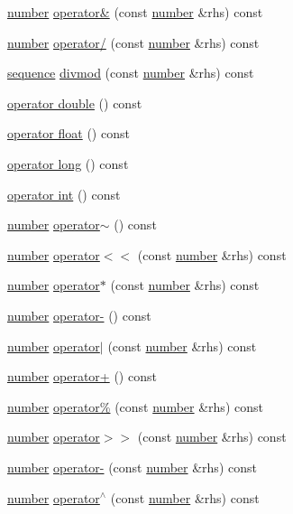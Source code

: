 \begin{DoxyCompactItemize}
\item 
\hyperlink{classpy_1_1number}{number} \hyperlink{classpy_1_1number_afbc448681bb327f89e74c28ebe852c90}{operator\&} (const \hyperlink{classpy_1_1number}{number} \&rhs) const 
\item 
\hyperlink{classpy_1_1number}{number} \hyperlink{classpy_1_1number_a9d61eba9d2067c9c24a053403bfdc526}{operator/} (const \hyperlink{classpy_1_1number}{number} \&rhs) const 
\item 
\hyperlink{classpy_1_1sequence}{sequence} \hyperlink{classpy_1_1number_aa964ed3c087ec2d8d8990af8c78086bc}{divmod} (const \hyperlink{classpy_1_1number}{number} \&rhs) const 
\item 
\hyperlink{classpy_1_1number_a9e40b859b859d961e98becd822aaaf5e}{operator double} () const 
\item 
\hyperlink{classpy_1_1number_aaeaaf00952cacb659a6749db5179bd80}{operator float} () const 
\item 
\hyperlink{classpy_1_1number_a2012278783e20c93faecb62a2b83b9c2}{operator long} () const 
\item 
\hyperlink{classpy_1_1number_a9f286deb3cf18acf4f71a34c02e101c9}{operator int} () const 
\item 
\hyperlink{classpy_1_1number}{number} \hyperlink{classpy_1_1number_a6adc4fa7ecceb41e3f2f30cffbff7759}{operator$\sim$} () const 
\item 
\hyperlink{classpy_1_1number}{number} \hyperlink{classpy_1_1number_aa2e5907d8dd1373bd365a85c19d3b98e}{operator$<$$<$} (const \hyperlink{classpy_1_1number}{number} \&rhs) const 
\item 
\hyperlink{classpy_1_1number}{number} \hyperlink{classpy_1_1number_a2e83785274c47904e2e978783f924311}{operator$\ast$} (const \hyperlink{classpy_1_1number}{number} \&rhs) const 
\item 
\hyperlink{classpy_1_1number}{number} \hyperlink{classpy_1_1number_ad0be1a677268fc5bafa180fc14bd5cf6}{operator-\/} () const 
\item 
\hyperlink{classpy_1_1number}{number} \hyperlink{classpy_1_1number_a0a0cc9efe8e507aa15b3a5aa70460171}{operator$\vert$} (const \hyperlink{classpy_1_1number}{number} \&rhs) const 
\item 
\hyperlink{classpy_1_1number}{number} \hyperlink{classpy_1_1number_a6f79ed3557773b5af9fdbbe6f0eea28c}{operator+} () const 
\item 
\hyperlink{classpy_1_1number}{number} \hyperlink{classpy_1_1number_a1bb65922275c06e5e48bac117044bd6a}{operator\%} (const \hyperlink{classpy_1_1number}{number} \&rhs) const 
\item 
\hyperlink{classpy_1_1number}{number} \hyperlink{classpy_1_1number_abb20c8f57a61840af7d29ee644767618}{operator$>$$>$} (const \hyperlink{classpy_1_1number}{number} \&rhs) const 
\item 
\hyperlink{classpy_1_1number}{number} \hyperlink{classpy_1_1number_ad0415bc81bc6fac0cdd8f6f76aac79ea}{operator-\/} (const \hyperlink{classpy_1_1number}{number} \&rhs) const 
\item 
\hyperlink{classpy_1_1number}{number} \hyperlink{classpy_1_1number_ab47208dec6f633c13cb781c46f1aa47d}{operator$^\wedge$} (const \hyperlink{classpy_1_1number}{number} \&rhs) const 
\end{DoxyCompactItemize}
